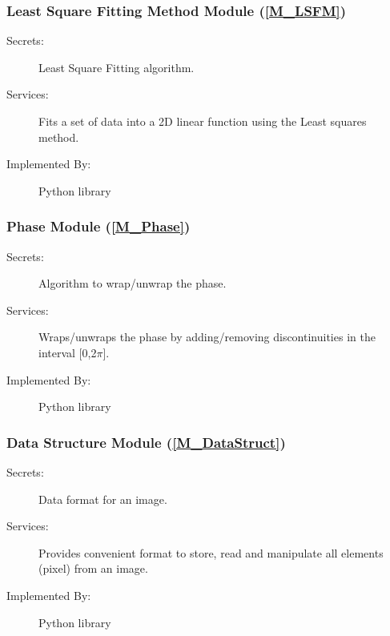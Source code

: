 \documentclass[12pt, titlepage]{article}
\begin{document}
\subsubsection{Least Square Fitting Method Module (\texorpdfstring{\cref{M_LSFM}}))}
\label{MG_LSFM}
\begin{description}
\item[Secrets:] Least Square Fitting algorithm.
\item[Services:] Fits a set of data into a 2D linear function using the Least 
squares method.
\item[Implemented By:] Python library
\end{description}

\subsubsection{Phase Module (\texorpdfstring{\cref{M_Phase}}))}
\label{MG_Phase}
\begin{description}
\item[Secrets:] Algorithm to wrap/unwrap the phase.
\item[Services:] Wraps/unwraps the phase by adding/removing discontinuities in 
the interval [0,2$\pi$].
\item[Implemented By:]Python library
\end{description}

\subsubsection{Data Structure Module (\texorpdfstring{\cref{M_DataStruct}}))}
\label{MG_DataStruct}
\begin{description}
\item[Secrets:] Data format for an image.
\item[Services:] Provides convenient format to store, read and manipulate all 
elements (pixel) from an image.
\item[Implemented By:] Python library
\end{description}

\end{document}
